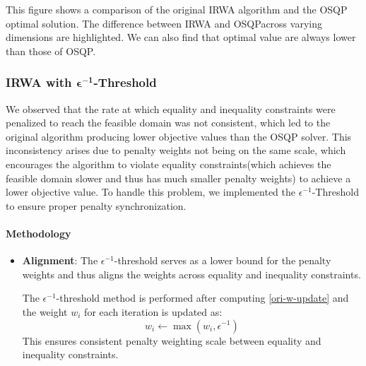 \documentclass{article}
\begin{document}
This figure shows a comparison of the original IRWA algorithm and the OSQP optimal solution. The difference between IRWA and OSQPacross varying dimensions are highlighted. We can also find that optimal value are always lower than those of OSQP.

\subsubsection{IRWA with \(\mathbf{\epsilon^{-1}}\)-Threshold}
We observed that the rate at which equality and inequality constraints were penalized to reach the feasible domain was not consistent, which led to the original algorithm producing lower objective values than the OSQP solver. This inconsistency arises due to penalty weights not being on the same scale, which encourages the algorithm to violate equality constraints(which achieves the feasible domain slower and thus has much smaller penalty weights) to achieve a lower objective value. To handle this problem, we implemented the \({\epsilon^{-1}}\)-Threshold to ensure proper penalty synchronization.
\paragraph{Methodology}
\begin{itemize}
    \item \textbf{Alignment}: 
    The \(\epsilon^{-1}\)-threshold serves as a lower bound for the penalty weights and thus aligns the weights across equality and inequality constraints.
    
    The \(\epsilon^{-1}\)-threshold method is performed after computing \ref{ori-w-update} and the weight $w_i$ for each iteration is updated as:
    \begin{equation}
    w_i \leftarrow \max\left(w_i, \epsilon^{-1}\right)
    \end{equation}
    This ensures consistent penalty weighting scale between equality and inequality constraints.


\end{itemize}
\end{document}
